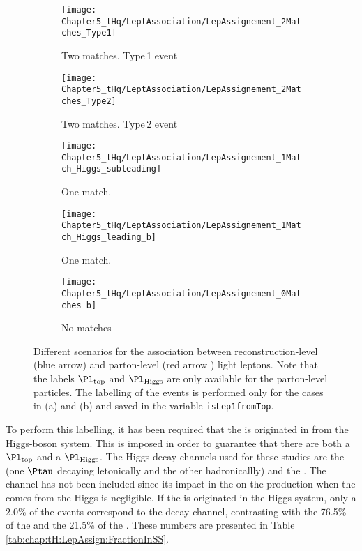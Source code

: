 \begin{figure}
\centering
\begin{subfigure}{.49\textwidth}
  \centering
  \texttt{[image: Chapter5\_tHq/LeptAssociation/LepAssignement\_2Matches\_Type1]}
  \caption{Two matches. Type$\,$1 event}
  \label{fig:chap:tH:LepAssign:Match:Type1}
\end{subfigure} 
\begin{subfigure}{.49\textwidth}
  \centering
  \texttt{[image: Chapter5\_tHq/LeptAssociation/LepAssignement\_2Matches\_Type2]}
  \caption{Two matches. Type$\,$2 event}
  \label{fig:chap:tH:LepAssign:Match:Type2}
\end{subfigure}

\begin{subfigure}{.49\textwidth}
  \centering
  \texttt{[image: Chapter5\_tHq/LeptAssociation/LepAssignement\_1Match\_Higgs\_subleading]}
  \caption{One match.}
  \label{fig:chap:tH:LepAssign:Match:1Match}
\end{subfigure}\hfill
\begin{subfigure}{.49\textwidth}
  \centering
  \texttt{[image: Chapter5\_tHq/LeptAssociation/LepAssignement\_1Match\_Higgs\_leading\_b]}
  \caption{One match.}
  \label{fig:chap:tH:LepAssign:Match:1Match_b}
\end{subfigure}

\begin{subfigure}{.5\textwidth}
  \centering
  \texttt{[image: Chapter5\_tHq/LeptAssociation/LepAssignement\_0Matches\_b]}
  \caption{No matches}
  \label{fig:chap:tH:LepAssign:Match:0Matchs}
\end{subfigure}
\caption{	Different scenarios for the association between reconstruction-level (blue arrow) 
		and parton-level (red arrow ) light leptons. 
		Note that the labels $\Pl_{\text{top}}$ and $\Pl_{\text{Higgs}}$ are only available 
		for the parton-level particles. The labelling of the events is performed only for the 
		cases in (a) and (b) and saved in the variable \texttt{isLep1fromTop}.}
\label{fig:chap:tH:LepAssign:Match}
\end{figure}

To perform this labelling, it has been required that the \tauhad is originated in from the Higgs-boson 
system. This is imposed in order to guarantee that there are both a $\Pl_{\text{top}}$ and a $\Pl_{\text{Higgs}}$. 
The Higgs-decay channels used for these studies are the \Htautau (one $\Ptau$ decaying letonically 
and the other hadronicallly) and the \HWW. The \HZZ channel has not been included since its impact 
in the on the \dileptau production when the \tauhad comes from the Higgs is negligible. If the \tauhad is
originated in the Higgs system, only a 2.0\% of the events correspond to the \HZZ decay channel, 
contrasting with the 76.5\% of the \Htautau and the 21.5\% of the \HWW. These numbers are
presented in Table \ref{tab:chap:tH:LepAssign:FractionInSS}.

